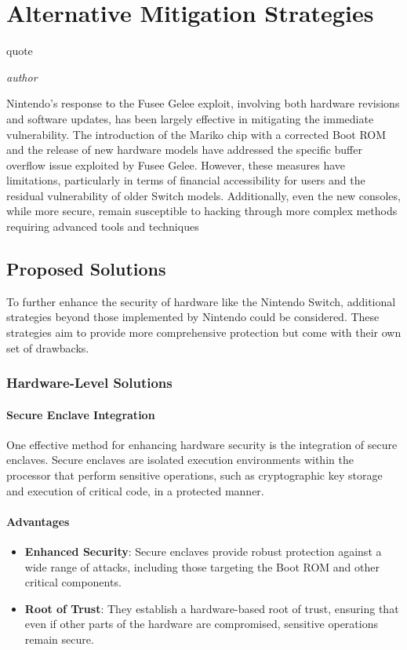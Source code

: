 \chapter{Alternative Mitigation Strategies}
\epigraph{quote}{\textit{author}}

Nintendo's response to the Fusee Gelee exploit, involving both hardware revisions and software updates, has been largely effective in mitigating the immediate vulnerability. The introduction of the Mariko chip with a corrected Boot ROM and the release of new hardware models have addressed the specific buffer overflow issue exploited by Fusee Gelee. However, these measures have limitations, particularly in terms of financial accessibility for users and the residual vulnerability of older Switch models. Additionally, even the new consoles, while more secure, remain susceptible to hacking through more complex methods requiring advanced tools and techniques

\section{Proposed Solutions}
To further enhance the security of hardware like the Nintendo Switch, additional strategies beyond those implemented by Nintendo could be considered. These strategies aim to provide more comprehensive protection but come with their own set of drawbacks.

\subsection{Hardware-Level Solutions}
\subsubsection{Secure Enclave Integration}

One effective method for enhancing hardware security is the integration of secure enclaves. Secure enclaves are isolated execution environments within the processor that perform sensitive operations, such as cryptographic key storage and execution of critical code, in a protected manner.

\subsubsection{Advantages}

\begin{itemize}
    \item \textbf{Enhanced Security}: Secure enclaves provide robust protection against a wide range of attacks, including those targeting the Boot ROM and other critical components.
    \item \textbf{Root of Trust}: They establish a hardware-based root of trust, ensuring that even if other parts of the hardware are compromised, sensitive operations remain secure.
\end{itemize}
